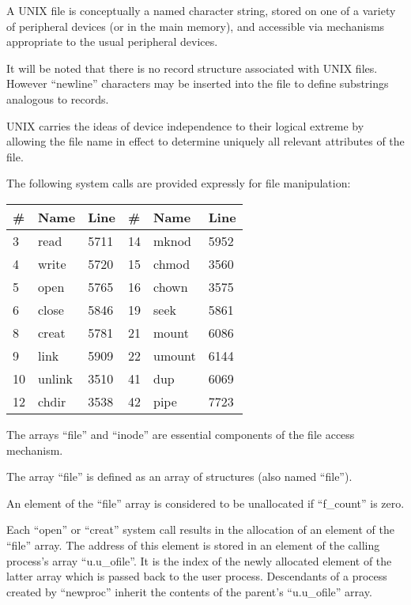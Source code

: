 A UNIX file is conceptually a named
character string, stored on one of a
variety of peripheral devices (or in
the main memory), and accessible via
mechanisms appropriate to the usual
peripheral devices.

It will be noted that there is no
record structure associated with UNIX
files. However ``newline'' characters may
be inserted into the file to define
substrings analogous to records.
 
UNIX carries the ideas of device
independence to their logical extreme
by allowing the file name in effect to
determine uniquely all relevant attributes of the file.



The following system calls are provided
expressly for file manipulation:

\begin{center}
\begin{tabular}{llllll}
{\bf \#} & {\bf Name} & {\bf Line \hspace{0.5cm}} & {\bf \#} & {\bf Name} & {\bf Line}\\ \hline
3 & read & 5711 & 14 & mknod & 5952\\
4 & write & 5720 & 15 & chmod & 3560\\
5 & open & 5765 & 16 & chown & 3575\\
6 & close & 5846 & 19 & seek & 5861\\
8 & creat & 5781 & 21 & mount & 6086\\
9 & link & 5909 & 22 & umount & 6144\\
10 & unlink & 3510 & 41 & dup & 6069\\
12 & chdir & 3538 & 42 & pipe & 7723\\
\end{tabular}
\end{center}



The arrays ``file'' and ``inode'' are
essential components of the file access
mechanism.


The array ``file'' is defined as an array
of structures (also named ``file'').

An element of the ``file'' array is considered to be unallocated if ``f\_count''
is zero.

Each ``open'' or ``creat'' system call
results in the allocation of an element
of the ``file'' array. The address of
this element is stored in an element of
the calling process's array
``u.u\_ofile''. It is the index of the
newly allocated element of the latter
array which is passed back to the user
process. Descendants of a process
created by ``newproc'' inherit the
contents of the parent's ``u.u\_ofile''
array.


